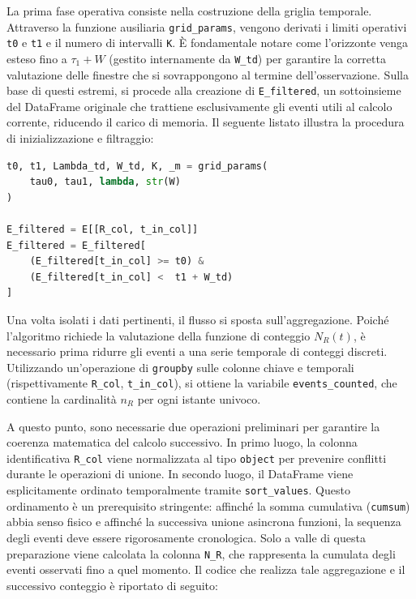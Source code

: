La prima fase operativa consiste nella costruzione della griglia temporale. Attraverso la funzione ausiliaria \texttt{grid\_params}, vengono derivati i limiti operativi \texttt{t0} e \texttt{t1} e il numero di intervalli \texttt{K}. È fondamentale notare come l'orizzonte venga esteso fino a $\tau_1 + W$ (gestito internamente da \texttt{W\_td}) per garantire la corretta valutazione delle finestre che si sovrappongono al termine dell'osservazione. Sulla base di questi estremi, si procede alla creazione di \texttt{E\_filtered}, un sottoinsieme del DataFrame originale che trattiene esclusivamente gli eventi utili al calcolo corrente, riducendo il carico di memoria. Il seguente listato illustra la procedura di inizializzazione e filtraggio:

\begin{lstlisting}[language=Python, caption={}]
t0, t1, Lambda_td, W_td, K, _m = grid_params(
    tau0, tau1, lambda, str(W)
)

E_filtered = E[[R_col, t_in_col]]
E_filtered = E_filtered[
    (E_filtered[t_in_col] >= t0) &
    (E_filtered[t_in_col] <  t1 + W_td)
]
\end{lstlisting}

Una volta isolati i dati pertinenti, il flusso si sposta sull'aggregazione. Poiché l'algoritmo richiede la valutazione della funzione di conteggio $N_R(t)$, è necessario prima ridurre gli eventi a una serie temporale di conteggi discreti. Utilizzando un'operazione di \texttt{groupby} sulle colonne chiave e temporali (rispettivamente \texttt{R\_col}, \texttt{t\_in\_col}), si ottiene la variabile \texttt{events\_counted}, che contiene la cardinalità $n_R$ per ogni istante univoco.

A questo punto, sono necessarie due operazioni preliminari per garantire la coerenza matematica del calcolo successivo. In primo luogo, la colonna identificativa \texttt{R\_col} viene normalizzata al tipo \texttt{object} per prevenire conflitti durante le operazioni di unione. In secondo luogo, il DataFrame viene esplicitamente ordinato temporalmente tramite \texttt{sort\_values}. Questo ordinamento è un prerequisito stringente: affinché la somma cumulativa (\texttt{cumsum}) abbia senso fisico e affinché la successiva unione asincrona funzioni, la sequenza degli eventi deve essere rigorosamente cronologica. Solo a valle di questa preparazione viene calcolata la colonna \texttt{N\_R}, che rappresenta la cumulata degli eventi osservati fino a quel momento. Il codice che realizza tale aggregazione e il successivo conteggio è riportato di seguito:

